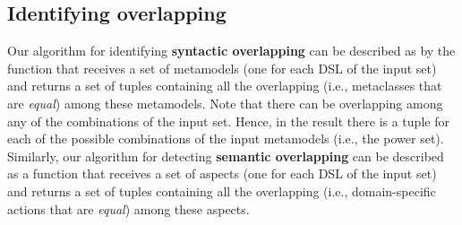 \subsection{Identifying overlapping}
\label{sec:metrics}
Our algorithm for identifying \textbf{syntactic overlapping} can be described as by the function that receives a set of metamodels (one for each DSL of the input set) and returns a set of tuples containing all the overlapping (i.e., metaclasses that are \textit{equal}) among these metamodels. Note that there can be overlapping among any of the combinations of the input set. Hence, in the result there is a tuple for each of the possible combinations of the input metamodels (i.e., the power set). Similarly, our algorithm for detecting \textbf{semantic overlapping} can be described as a function that receives a set of aspects (one for each DSL of the input set) and returns a set of tuples containing all the overlapping (i.e., domain-specific actions that are \textit{equal}) among these aspects.






